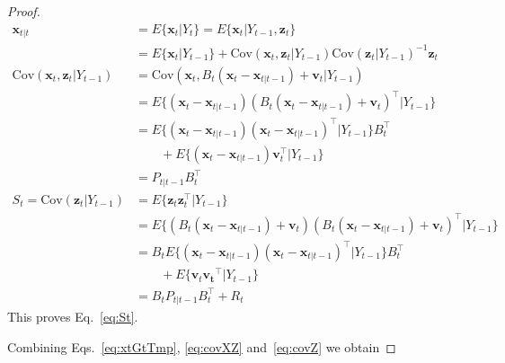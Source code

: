 \documentclass[12pt]{article}
\begin{document}
\begin{proof}
    \begin{align}
        \mathbf{x}_{t|t}&=E\{\mathbf{x}_t|Y_t\}=E\{\mathbf{x}_t|Y_{t-1},\mathbf{z}_t\}\label{eq:measureTheoryEq}\\
                        &=E\{\mathbf{x}_t|Y_{t-1}\}+\text{Cov}\left(\mathbf{x}_t,\mathbf{z}_t|Y_{t-1}\right)\text{Cov}\left(\mathbf{z}_t|Y_{t-1}\right)^{-1}\mathbf{z}_t\label{eq:xtGtTmp}\\
        \text{Cov}\left(\mathbf{x}_t,\mathbf{z}_t|Y_{t-1}\right)&=\text{Cov}\left(\mathbf{x}_t,B_t(\mathbf{x}_t-\mathbf{x}_{t|t-1})+\mathbf{v}_t|Y_{t-1}\right)\nonumber\\
                                                                &=E\{(\mathbf{x}_t-\mathbf{x}_{t|t-1})(B_t(\mathbf{x}_t-\mathbf{x}_{t|t-1})+\mathbf{v}_t)^\intercal|Y_{t-1}\}\nonumber\\
                                                                &=E\{(\mathbf{x}_t-\mathbf{x}_{t|t-1})(\mathbf{x}_t-\mathbf{x}_{t|t-1})^\intercal|Y_{t-1}\}B_t^\intercal\nonumber\\
                                                                &\qquad +E\{(\mathbf{x}_t-\mathbf{x}_{t|t-1})\mathbf{v}_t^\intercal|Y_{t-1}\}\nonumber\\
                                                                &=P_{t|t-1}B_t^\intercal\label{eq:covXZ}\\
        S_t=\text{Cov}\left(\mathbf{z}_t|Y_{t-1}\right)&=E\{\mathbf{z}_t\mathbf{z}_t^\intercal|Y_{t-1}\}\nonumber\\
                                                       &=E\{\left(B_t(\mathbf{x}_t-\mathbf{x}_{t|t-1})+\mathbf{v}_t\right)\left(B_t(\mathbf{x}_t-\mathbf{x}_{t|t-1})+\mathbf{v}_t\right)^\intercal|Y_{t-1}\}\nonumber\\
                                                       &=B_tE\{\left(\mathbf{x}_t-\mathbf{x}_{t|t-1}\right)\left(\mathbf{x}_t-\mathbf{x}_{t|t-1}\right)^\intercal|Y_{t-1}\}B_t^\intercal\nonumber\\
                                                       &\qquad +E\{\mathbf{v}_t\mathbf{v_t}^\intercal|Y_{t-1}\}\nonumber\\
                                                       &=B_tP_{t|t-1}B_t^\intercal+R_t\label{eq:covZ}
    \end{align}
	This proves Eq.~\ref{eq:St}.

    Combining Eqs.~\ref{eq:xtGtTmp}, \ref{eq:covXZ} and~\ref{eq:covZ} we obtain


\end{proof}
\end{document}
